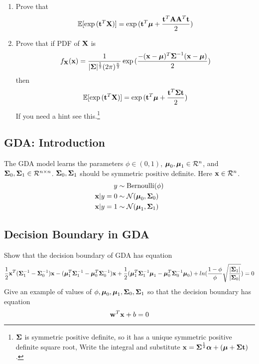 \begin{enumerate}[label=\alph*)]
\item Prove that
\begin{equation*}
\mathbb{E}[\exp{(\mathbf{t}^T \mathbf{X})}] = \exp{(\mathbf{t}^T\boldsymbol{\mu}+ \frac{\mathbf{t}^T\mathbf{A}\mathbf{A}^T\mathbf{t}}{2})}
\end{equation*}

\item Prove that if PDF of $\mathbf{X}$ is 
    \begin{equation*}
        f_{\mathbf{X}}(\mathbf{x}) = \frac{1}{|\boldsymbol{\Sigma}|^{\frac{1}{2}}(2\pi)^{\frac{n}{2}}}\exp{(\frac{-(\mathbf{x}- \boldsymbol{\mu})^T\boldsymbol{\Sigma}^{-1}(\mathbf{x}- \boldsymbol{\mu})}{2})}
    \end{equation*}
    then 
    \begin{equation*}
    \mathbb{E}[\exp{(\mathbf{t}^T \mathbf{X})}] = \exp{(\mathbf{t}^T\boldsymbol{\mu}+ \frac{\mathbf{t}^T\boldsymbol{\Sigma}\mathbf{t}}{2})}
    \end{equation*}
    If you need a hint see this.\footnote{$\boldsymbol{\Sigma}$ is symmetric positive definite, so it has a unique symmetric positive definite square root, Write the integral and substitute $\mathbf{x} = \boldsymbol{\Sigma}^{\frac{1}{2}}\boldsymbol{\alpha} + (\boldsymbol{\mu} + \boldsymbol{\Sigma} \mathbf{t})$.}


    
\end{enumerate}

\subsection{GDA: Introduction}\label{gda_ref}
The GDA model learns the parameters $\phi \in (0, 1)$, $\boldsymbol{\mu}_0, \boldsymbol{\mu}_1 \in \mathcal{R}^n$, and $\boldsymbol{\Sigma}_0, \boldsymbol{\Sigma}_1 \in \mathcal{R}^{n \times n}$.  $\boldsymbol{\Sigma}_0, \boldsymbol{\Sigma}_1$ should be symmetric positive definite. Here $\mathbf{x} \in \mathcal{R}^n$.
\begin{align*}
    y &\sim \text{Bernoulli}(\phi)\\
    \mathbf{x} | y = 0 &\sim \mathcal{N}(\boldsymbol{\mu}_0, \boldsymbol{\Sigma}_0)\\
    \mathbf{x} | y = 1 &\sim \mathcal{N}(\boldsymbol{\mu}_1, \boldsymbol{\Sigma}_1)
\end{align*}
\subsection{Decision Boundary in GDA}
Show that the decision boundary of GDA has equation
\begin{equation*}
\frac{1}{2} \mathbf{x}^T(\boldsymbol{\Sigma}^{-1}_1 - \boldsymbol{\Sigma}^{-1}_0)\mathbf{x} - (\boldsymbol{\mu}^T_1 \boldsymbol{\Sigma}^{-1}_1 - \boldsymbol{\mu}^T_0 \boldsymbol{\Sigma}^{-1}_0)\mathbf{x} + \frac{1}{2}(\boldsymbol{\mu}^T_1 \boldsymbol{\Sigma}^{-1}_1 \boldsymbol{\mu}_1 - \boldsymbol{\mu}^T_0 \boldsymbol{\Sigma}^{-1}_0 \boldsymbol{\mu}_0) + ln(\frac{1 - \phi}{\phi} \sqrt{\frac{|\boldsymbol{\Sigma}_1|}{|\boldsymbol{\Sigma}_0|}}) = 0
\end{equation*}
Give an example of values of $\phi, \boldsymbol{\mu}_0, \boldsymbol{\mu}_1, \boldsymbol{\Sigma}_0, \boldsymbol{\Sigma}_1$ so that the decision boundary has equation 
\begin{equation*}
    \mathbf{w}^T \mathbf{x} + b = 0
\end{equation*}

